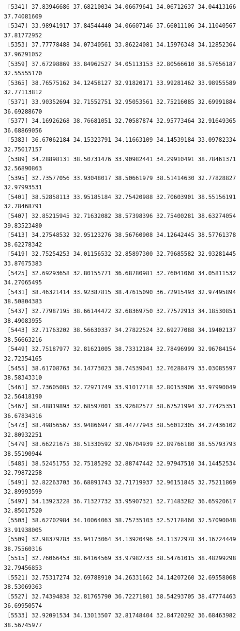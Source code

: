 \documentclass[
  letterpaper,
  DIV=11,
  numbers=noendperiod]{scrartcl}
\begin{document}
\begin{verbatim}
 [5341] 37.83946686 37.68210034 34.06679641 34.06712637 34.04413166 37.74081609
 [5347] 33.98941917 37.84544440 34.06607146 37.66011106 34.11040567 37.81772952
 [5353] 37.77778488 34.07340561 33.86224081 34.15976348 34.12852364 37.96291052
 [5359] 37.67298869 33.84962527 34.05113153 32.80566610 38.57656187 32.55555170
 [5365] 38.76575162 34.12458127 32.91820171 33.99281462 33.98955589 32.77113812
 [5371] 33.90352694 32.71552751 32.95053561 32.75216085 32.69991884 36.69288670
 [5377] 34.16926268 38.76681051 32.70587874 32.95773464 32.91649365 36.68869056
 [5383] 36.67062184 34.15323791 34.11663109 34.14539184 33.09782334 32.75017157
 [5389] 34.28898131 38.50731476 33.90982441 34.29910491 38.78461371 32.56890863
 [5395] 32.73577056 33.93048017 38.50661979 38.51414630 32.77828827 32.97993531
 [5401] 38.52858113 33.95185184 32.75420988 32.70603901 38.55156191 32.78468791
 [5407] 32.85215945 32.71632082 38.57398396 32.75400281 38.63274054 39.83523480
 [5413] 34.27548532 32.95123276 38.56760908 34.12642445 38.57761378 38.62278342
 [5419] 32.75254253 34.01156532 32.85897300 32.79685582 32.93281445 33.87675383
 [5425] 32.69293658 32.80155771 36.68780981 32.76041060 34.05811532 34.27065495
 [5431] 38.46321414 33.92387815 38.47615090 36.72915493 32.97495894 38.50804383
 [5437] 32.77987195 38.66144472 32.68369750 32.77572913 34.18530851 38.49083955
 [5443] 32.71763202 38.56630337 34.27822524 32.69277088 34.19402137 38.56663216
 [5449] 32.75187977 32.81621005 38.73312184 32.78496999 32.96784154 32.72354165
 [5455] 38.61708763 34.14773023 38.74539041 32.76288479 33.03085597 38.58343310
 [5461] 32.73605085 32.72971749 33.91017718 32.80153906 33.97990049 32.56418190
 [5467] 38.48819893 32.68597001 33.92682577 38.67521994 32.77425351 36.67834316
 [5473] 38.49856567 33.94866947 38.44777943 38.56012305 34.27436102 32.80932251
 [5479] 38.66221675 38.51330592 32.96704939 32.89766180 38.55793793 38.55190944
 [5485] 38.52451755 32.75185292 32.88747442 32.97947510 34.14452534 32.79872258
 [5491] 32.82263703 36.68891743 32.71719937 32.96151845 32.75211869 32.89993599
 [5497] 34.13923228 36.71327732 33.95907321 32.71483282 36.65920617 32.85017520
 [5503] 38.62702984 34.10064063 38.75735103 32.57178460 32.57090048 33.91938005
 [5509] 32.98379783 33.94173064 34.13920496 34.11372978 34.16724449 38.75560316
 [5515] 32.76066453 38.64164569 33.97982733 38.54761015 38.48299298 32.79456853
 [5521] 32.75317274 32.69788910 34.26331662 34.14207260 32.69558068 38.53069363
 [5527] 32.74394838 32.81765790 36.72271801 38.54293705 38.47774463 36.69950574
 [5533] 32.92091534 34.13013507 32.81748404 32.84720292 36.68463982 38.56745977

\end{verbatim}
\end{document}
